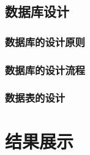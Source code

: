 \documentclass{ctexart}
\begin{document}
\subsection{数据库设计}
\subsubsection{数据库的设计原则}
\subsubsection{数据库的设计流程}
\subsubsection{数据表的设计}


\section{结果展示}
\end{document}
